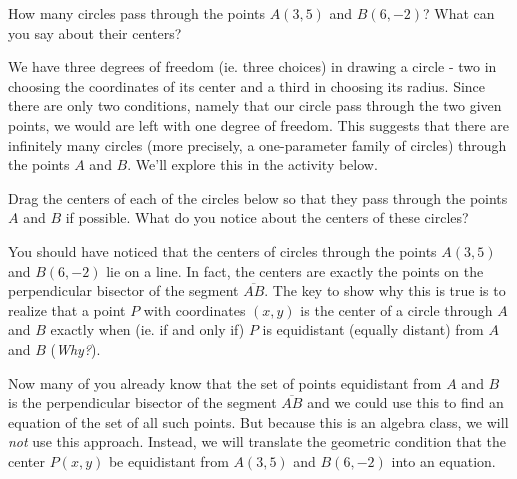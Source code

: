 \documentclass{ximera}
\begin{document}
\begin{example}  \label{Ex5sdfdsfdsf}
How many circles pass through the points $A(3,5)$ and $B(6,-2)$? What can you say about their centers?

\begin{explanation}
We have three degrees of freedom (ie. three choices) in drawing a circle - two in choosing the coordinates of its center and a third in choosing its radius. Since there are only two conditions, namely that our circle pass through the two given points, we would are left with one degree of freedom. This suggests that there are infinitely many circles (more precisely, a one-parameter family of circles) through the points $A$ and $B$. We'll explore this in the activity below. 


\begin{exploration}\label{exp:circle1}
Drag the centers of each of the circles below so that they pass through the points $A$ and $B$ if possible. What do you notice about the centers of these circles?
 
 
\begin{onlineOnly}
    \begin{center}
\end{center}
\end{onlineOnly}
\end{exploration}

You should have noticed that the centers of circles through the points $A(3,5)$ and $B(6,-2)$ lie on a line. In fact, the centers are exactly the points on the perpendicular bisector of the segment $\overline{AB}$. The key to show why this is true is to realize that a point $P$ with coordinates $(x,y)$ is the center of a circle through $A$ and $B$ exactly when (ie. if and only if) $P$ is equidistant (equally distant) from $A$ and $B$ (\emph{Why?}). 

Now many of you already know that the set of points equidistant from $A$ and $B$ is the perpendicular bisector of the segment $\overline{AB}$ and we could use this to find an equation of the set of all such points. But because this is an algebra class, we will \emph{not} use this approach. Instead, we will translate the geometric condition that the center $P(x,y)$ be equidistant from $A(3,5)$ and $B(6,-2)$ into an equation.



\end{explanation}
\end{example}
\end{document}
